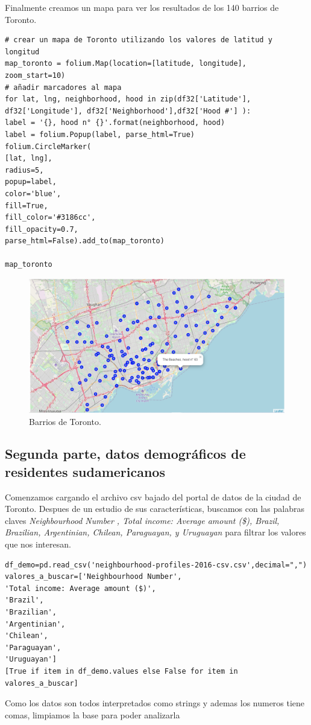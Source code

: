\documentclass[10pt,a4paper,arial, spanish]{article}
\begin{document}
Finalmente creamos un mapa para ver los resultados de los 140 barrios de Toronto.
\begin{verbatim}
# crear un mapa de Toronto utilizando los valores de latitud y longitud
map_toronto = folium.Map(location=[latitude, longitude], zoom_start=10)
# añadir marcadores al mapa
for lat, lng, neighborhood, hood in zip(df32['Latitude'], df32['Longitude'], df32['Neighborhood'],df32['Hood #'] ):
label = '{}, hood n° {}'.format(neighborhood, hood)
label = folium.Popup(label, parse_html=True)
folium.CircleMarker(
[lat, lng],
radius=5,
popup=label,
color='blue',
fill=True,
fill_color='#3186cc',
fill_opacity=0.7,
parse_html=False).add_to(map_toronto)  

map_toronto
\end{verbatim}
\begin{figure}[h]
	\centering
	\includegraphics[scale=0.45]{map1}
	\caption[Barrios de Toronto.]{Barrios de Toronto.}
	\label{fig:map1}
\end{figure}

\subsection{Segunda parte, datos demográficos de residentes sudamericanos}
Comenzamos cargando el archivo csv bajado del portal de datos de la ciudad de Toronto. Despues de un estudio de sus características, buscamos con las palabras claves \emph{Neighbourhood Number , Total income: Average amount (\$), Brazil, Brazilian, Argentinian, Chilean, Paraguayan, y Uruguayan} para filtrar los valores que nos interesan.
\begin{verbatim}
df_demo=pd.read_csv('neighbourhood-profiles-2016-csv.csv',decimal=",") 
valores_a_buscar=['Neighbourhood Number',
'Total income: Average amount ($)',
'Brazil', 
'Brazilian', 
'Argentinian',
'Chilean',
'Paraguayan',
'Uruguayan']
[True if item in df_demo.values else False for item in valores_a_buscar] 
\end{verbatim}
Como los datos son todos interpretados como strings y ademas los numeros tiene comas, limpiamos la base para poder analizarla
\end{document}
